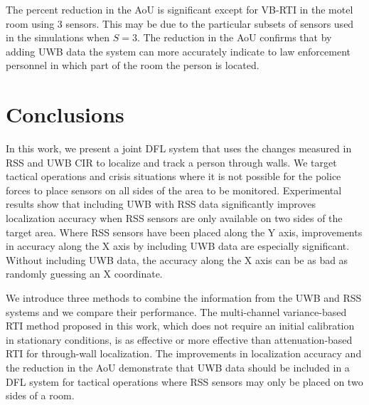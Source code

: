 \documentclass[conference]{IEEEtran}
\begin{document}
The percent reduction in the AoU is significant except for VB-RTI in
the motel room using $3$ sensors. This may be due to the particular
subsets of sensors used in the simulations when $S=3$. The reduction
in the AoU confirms that by adding UWB data the system can more
accurately indicate to law enforcement personnel in which part of the
room the person is located.



\section{Conclusions} \label{sec:conclusions}

In this work, we present a joint DFL system that uses the changes
measured in RSS and UWB CIR to localize and track a person through
walls. We target tactical operations and crisis situations where it is
not possible for the police forces to place sensors on all sides of
the area to be monitored. Experimental results show that including UWB
with RSS data significantly improves localization accuracy when RSS
sensors are only available on two sides of the target area. Where RSS
sensors have been placed along the Y axis, improvements in accuracy
along the X axis by including UWB data are especially
significant. Without including UWB data, the accuracy along the X axis
can be as bad as randomly guessing an X coordinate.

We introduce three methods to combine the information from the UWB and
RSS systems and we compare their performance. The multi-channel
variance-based RTI method proposed in this work, which does not
require an initial calibration in stationary conditions, is as
effective or more effective than attenuation-based RTI for
through-wall localization. The improvements in localization accuracy
and the reduction in the AoU demonstrate that UWB data should be
included in a DFL system for tactical operations where RSS sensors
may only be placed on two sides of a room.


 
\end{document}
